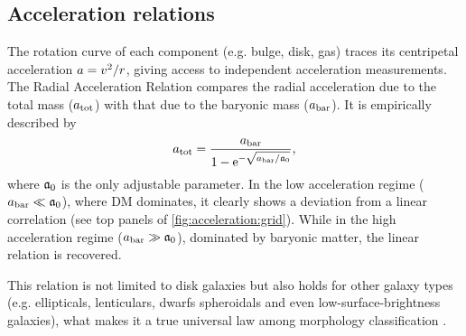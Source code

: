 


\subsection{Acceleration relations}
\label{sec:result:ac}


The rotation curve of each component (e.g. bulge, disk, gas) traces its centripetal acceleration $a = v^2/r$, giving access to independent acceleration measurements. The Radial Acceleration Relation compares the radial acceleration due to the total mass ($a_\mathrm{tot}$) with that due to the baryonic mass ($a_\mathrm{bar}$). It is empirically described by \cite{2016PhRvL.117t1101M}
%
\begin{equation}
	\label{eq:mcgaugh-fit}
	\SYMatot = \frac{\SYMabar}{1 - \e^{-\sqrt{\SYMabar/{\SYMafrak}}}},
\end{equation}
%
where $\mathfrak{a}_0$ is the only adjustable parameter. In the low acceleration regime ($a_\mathrm{bar} \ll \mathfrak{a}_0$), where DM dominates, it clearly shows a deviation from a linear correlation (see top panels of \cref{fig:acceleration:grid}). While in the high acceleration regime ($a_\mathrm{bar} \gg \mathfrak{a}_0$), dominated by baryonic matter, the linear relation is recovered.

This relation is not limited to disk galaxies but also holds for other galaxy types (e.g. ellipticals, lenticulars, dwarfs spheroidals and even low-surface-brightness galaxies), what makes it a true universal law among morphology classification \citep{2016PhRvL.117t1101M,2017ApJ...836..152L,2019ApJ...873..106D}.



